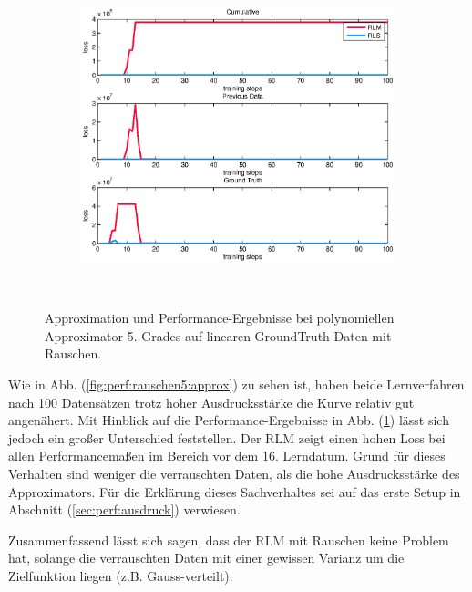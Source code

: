 \documentclass[a4paper, 12pt]{article}
\begin{document}
{\begin{figure}[H]
\begin{subfigure}[b]{0.4\textwidth}
                \includegraphics[width=\textwidth]{./images/copyofstats/rauschen5_perf_100.eps}
                \caption{}
                \label{fig:perf:rauschen5:perf}
        \end{subfigure}
        \\
        \caption{Approximation und Performance-Ergebnisse bei polynomiellen Approximator 5. Grades auf linearen GroundTruth-Daten mit Rauschen.}
        \label{fig:perf:rauschen5}
\end{figure}
Wie in Abb. (\ref{fig:perf:rauschen5:approx}) zu sehen ist, haben beide Lernverfahren nach 100 Datensätzen trotz hoher Ausdrucksstärke die Kurve relativ gut angenähert. Mit Hinblick auf die Performance-Ergebnisse in Abb. (\ref{fig:perf:rauschen5:perf}) lässt sich jedoch ein großer Unterschied feststellen. Der RLM zeigt einen hohen Loss bei allen Performancemaßen im Bereich vor dem 16. Lerndatum.
Grund für dieses Verhalten sind weniger die verrauschten Daten, als die hohe Ausdrucksstärke des Approximators. Für die Erklärung dieses Sachverhaltes sei auf das erste Setup in Abschnitt (\ref{sec:perf:ausdruck}) verwiesen.

Zusammenfassend lässt sich sagen, dass der RLM mit Rauschen keine Problem hat, solange die verrauschten Daten mit einer gewissen Varianz um die Zielfunktion liegen (z.B. Gauss-verteilt).

}
\end{document}
